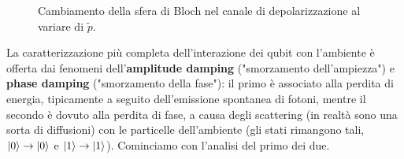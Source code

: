\begin{esempio}
\begin{figure}[!ht]
	\caption{Cambiamento della sfera di Bloch nel canale di depolarizzazione al variare di $\tilde p$.}
    \label{fig:depolarizing_channel}
    \end{figure}
\end{esempio}

\noindent La caratterizzazione più completa dell'interazione dei qubit con l'ambiente è offerta dai fenomeni dell'\textbf{amplitude damping} ("smorzamento dell'ampiezza") e \textbf{phase damping} ("smorzamento della fase"): il primo è associato alla perdita di energia, tipicamente a seguito dell'emissione spontanea di fotoni, mentre il secondo è dovuto alla perdita di fase, a causa degli scattering (in realtà sono una sorta di diffusioni) con le particelle dell'ambiente (gli stati rimangono tali, $\ket{0} \to \ket{0}$ e $\ket{1} \to \ket{1}$). Cominciamo con l'analisi del primo dei due.

